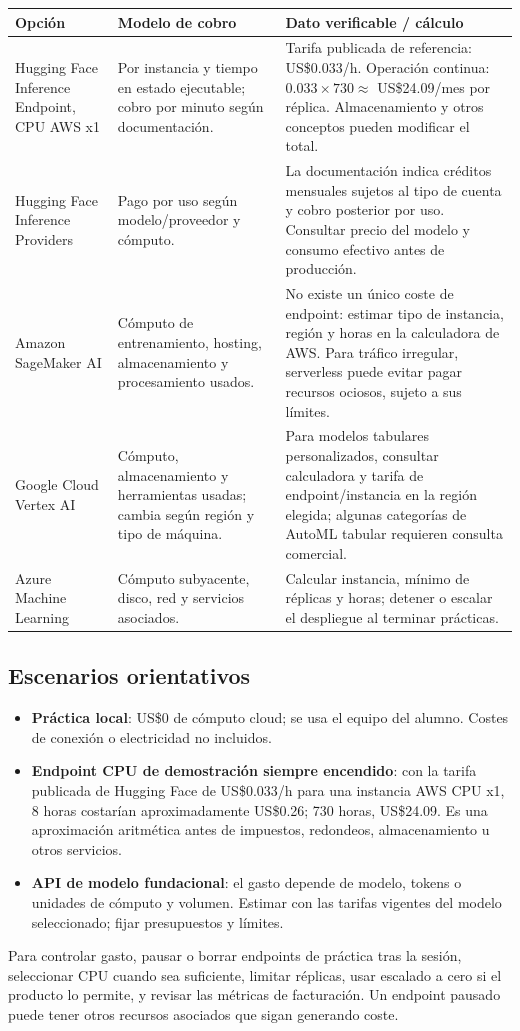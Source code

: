 \documentclass[11pt,a4paper]{article}
\begin{document}
\begin{longtable}{p{3.2cm}p{4.4cm}p{5.1cm}}
\toprule
\textbf{Opción} & \textbf{Modelo de cobro} & \textbf{Dato verificable / cálculo}\\
\midrule
Hugging Face Inference Endpoint, CPU AWS x1 & Por instancia y tiempo en estado ejecutable; cobro por minuto según documentación. & Tarifa publicada de referencia: US\$0.033/h. Operación continua: \(0.033 \times 730 \approx\) US\$24.09/mes por réplica. Almacenamiento y otros conceptos pueden modificar el total.\\
Hugging Face Inference Providers & Pago por uso según modelo/proveedor y cómputo. & La documentación indica créditos mensuales sujetos al tipo de cuenta y cobro posterior por uso. Consultar precio del modelo y consumo efectivo antes de producción.\\
Amazon SageMaker AI & Cómputo de entrenamiento, hosting, almacenamiento y procesamiento usados. & No existe un único coste de endpoint: estimar tipo de instancia, región y horas en la calculadora de AWS. Para tráfico irregular, serverless puede evitar pagar recursos ociosos, sujeto a sus límites.\\
Google Cloud Vertex AI & Cómputo, almacenamiento y herramientas usadas; cambia según región y tipo de máquina. & Para modelos tabulares personalizados, consultar calculadora y tarifa de endpoint/instancia en la región elegida; algunas categorías de AutoML tabular requieren consulta comercial.\\
Azure Machine Learning & Cómputo subyacente, disco, red y servicios asociados. & Calcular instancia, mínimo de réplicas y horas; detener o escalar el despliegue al terminar prácticas.\\
\bottomrule
\end{longtable}

\subsection{Escenarios orientativos}
\begin{itemize}
  \item \textbf{Práctica local}: US\$0 de cómputo cloud; se usa el equipo del alumno. Costes de conexión o electricidad no incluidos.
  \item \textbf{Endpoint CPU de demostración siempre encendido}: con la tarifa publicada de Hugging Face de US\$0.033/h para una instancia AWS CPU x1, 8 horas costarían aproximadamente US\$0.26; 730 horas, US\$24.09. Es una aproximación aritmética antes de impuestos, redondeos, almacenamiento u otros servicios.
  \item \textbf{API de modelo fundacional}: el gasto depende de modelo, tokens o unidades de cómputo y volumen. Estimar con las tarifas vigentes del modelo seleccionado; fijar presupuestos y límites.
\end{itemize}
Para controlar gasto, pausar o borrar endpoints de práctica tras la sesión, seleccionar CPU cuando sea suficiente, limitar réplicas, usar escalado a cero si el producto lo permite, y revisar las métricas de facturación. Un endpoint pausado puede tener otros recursos asociados que sigan generando coste.
\end{document}
